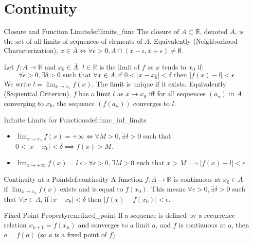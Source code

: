 \documentclass[11pt, a4paper]{article}
\begin{document}
\section{Continuity}

\begin{definition}{Closure and Function Limits}{def:limits_func}
The closure of $A \subset \mathbb{R}$, denoted $\overline{A}$, is the set of all limits of sequences of elements of $A$. Equivalently (Neighborhood Characterization), $x \in \overline{A} \iff \forall \epsilon > 0, A \cap (x-\epsilon, x+\epsilon) \neq \emptyset$.

Let $f: A \to \mathbb{R}$ and $x_0 \in \overline{A}$. $l \in \mathbb{R}$ is the limit of $f$ as $x$ tends to $x_0$ if:
$$ \forall \epsilon > 0, \exists \delta > 0 \text{ such that } \forall x \in A, \text{if } 0 < |x - x_0| < \delta \text{ then } |f(x) - l| < \epsilon $$
We write $l = \lim_{x \to x_0} f(x)$. The limit is unique if it exists.
Equivalently (Sequential Criterion), $f$ has a limit $l$ as $x \to x_0$ iff for all sequences $(a_n)$ in $A$ converging to $x_0$, the sequence $(f(a_n))$ converges to $l$.
\end{definition}

\begin{definition}{Infinite Limits for Functions}{def:func_inf_limits}
\begin{itemize}
    \item $\lim_{x \to x_0} f(x) = +\infty \iff \forall M > 0, \exists \delta > 0$ such that $0 < |x - x_0| < \delta \implies f(x) > M$.
    \item $\lim_{x \to +\infty} f(x) = l \iff \forall \epsilon > 0, \exists M > 0$ such that $x > M \implies |f(x) - l| < \epsilon$.
\end{itemize}
\end{definition}

\begin{definition}{Continuity at a Point}{def:continuity}
A function $f: A \to \mathbb{R}$ is continuous at $x_0 \in A$ if $\lim_{x \to x_0} f(x)$ exists and is equal to $f(x_0)$. This means $\forall \epsilon > 0, \exists \delta > 0$ such that $\forall x \in A$, if $|x - x_0| < \delta$ then $|f(x) - f(x_0)| < \epsilon$.
\end{definition}

\begin{remark}{Fixed Point Property}{rem:fixed_point}
If a sequence is defined by a recurrence relation $x_{n+1} = f(x_n)$ and converges to a limit $a$, and $f$ is continuous at $a$, then $a = f(a)$ (so $a$ is a fixed point of $f$).
\end{remark}
\end{document}

